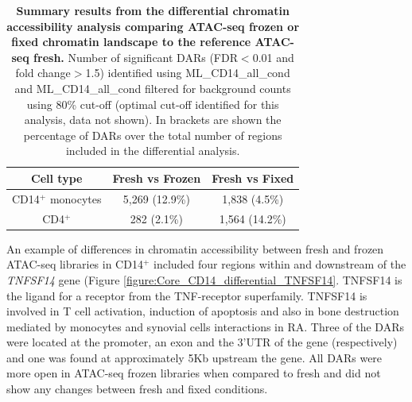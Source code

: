 	
\begin{table}[htbp]
\centering
\begin{tabular}{@{} c c c}
\toprule
\textbf{Cell type} & \textbf{Fresh vs Frozen} & \textbf{Fresh vs Fixed} \\
\midrule
\midrule
CD14$^+$ monocytes & 5,269 (12.9\%) & 1,838 (4.5\%) \\
CD4$^+$           & 282  (2.1\%)   & 1,564 (14.2\%) \\
\bottomrule
\end{tabular}
\medskip %
\caption[Summary results from the differential chromatin accessibility analysis comparing ATAC-seq frozen or fixed chromatin landscape to the reference ATAC-seq fresh.]{\textbf{Summary results from the differential chromatin accessibility analysis comparing ATAC-seq frozen or fixed chromatin landscape to the reference ATAC-seq fresh.} Number of significant DARs (FDR$<$0.01 and fold change$>$1.5) identified using ML\_CD14\_all\_cond and ML\_CD14\_all\_cond filtered for background counts using 80\% cut-off (optimal cut-off identified for this analysis, data not shown). In brackets are shown the percentage of DARs over the total number of regions included in the differential analysis.}
\label{tab:Core_ATAC_all_conditions_DARs}
\end{table}
\bigskip %
	
An example of differences in chromatin accessibility between fresh and frozen ATAC-seq libraries in CD14$^+$ included four regions within and downstream of the \textit{TNFSF14} gene (Figure \ref{figure:Core_CD14_differential_TNFSF14}. TNFSF14 is the ligand for a receptor from the TNF-receptor superfamily. TNFSF14 is involved in T cell activation, induction of apoptosis and  also in bone destruction mediated by monocytes and synovial cells interactions in RA. Three of the DARs were located at the promoter, an exon and the 3'UTR of the gene (respectively) and one was found at approximately 5Kb upstream the gene. All DARs were more open in ATAC-seq frozen libraries when compared to fresh and did not show any changes between fresh and fixed conditions.%

	
	
